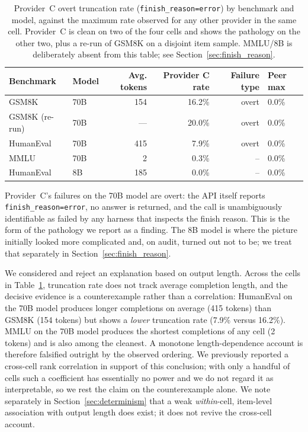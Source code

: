 \documentclass[11pt]{article}
\begin{document}
\begin{table}[t]
\centering
\small
\begin{tabular}{llrrrl}
\toprule
\textbf{Benchmark} & \textbf{Model} & \textbf{Avg. tokens} & \textbf{Provider C rate} & \textbf{Failure type} & \textbf{Peer max} \\
\midrule
GSM8K      & 70B & 154 & 16.2\% & overt   & 0.0\% \\
GSM8K (re-run) & 70B & --- & 20.0\% & overt   & 0.0\% \\
HumanEval  & 70B & 415 & 7.9\%  & overt   & 0.0\% \\
MMLU       & 70B & 2   & 0.3\%  & --      & 0.0\% \\
HumanEval  & 8B  & 185 & 0.0\%  & --      & 0.0\% \\
\bottomrule
\end{tabular}
\caption{Provider~C overt truncation rate
(\texttt{finish\_reason=error}) by benchmark and model, against the
maximum rate observed for any other provider in the same cell.
Provider~C is clean on two of the four cells and shows the pathology
on the other two, plus a re-run of GSM8K on a disjoint item sample.
MMLU/8B is deliberately absent from this table; see
Section~\ref{sec:finish_reason}.}
\label{tab:anchor}
\end{table}
Provider~C's failures on the 70B model are overt: the API itself
reports \texttt{finish\_reason=error}, no answer is returned, and the
call is unambiguously identifiable as failed by any harness that
inspects the finish reason. This is the form of the pathology we
report as a finding. The 8B model is where the picture initially
looked more complicated and, on audit, turned out not to be; we treat
that separately in Section~\ref{sec:finish_reason}.

We considered and reject an explanation based on output length. Across
the cells in Table~\ref{tab:anchor}, truncation rate does not track
average completion length, and the decisive evidence is a
counterexample rather than a correlation: HumanEval on the 70B model
produces longer completions on average (415 tokens) than GSM8K (154
tokens) but shows a \emph{lower} truncation rate (7.9\% versus
16.2\%). MMLU on the 70B model produces the shortest completions of
any cell (2 tokens) and is also among the cleanest. A monotone
length-dependence account is therefore falsified outright by the
observed ordering. We previously reported a cross-cell rank
correlation in support of this conclusion; with only a handful of
cells such a coefficient has essentially no power and we do not regard
it as interpretable, so we rest the claim on the counterexample
alone. We note separately in Section~\ref{sec:determinism} that a
weak \emph{within}-cell, item-level association with output length
does exist; it does not revive the cross-cell account.
\end{document}

